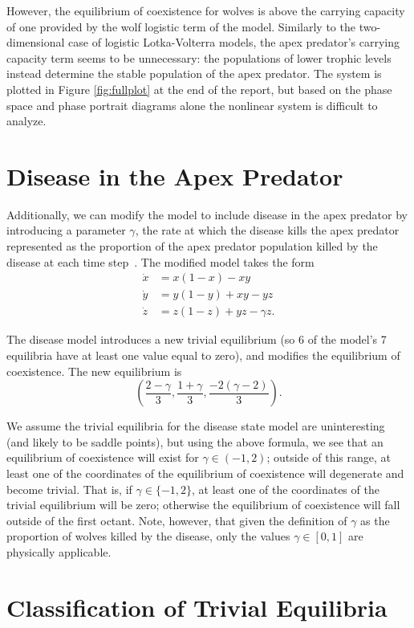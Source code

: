 \documentclass[10pt]{article}
\begin{document}
However, the equilibrium of coexistence for wolves is above the carrying capacity of one provided by the wolf logistic term of the model. Similarly to the two-dimensional case of logistic Lotka-Volterra models, the apex predator's carrying capacity term seems to be unnecessary: the populations of lower trophic levels instead determine the stable population of the apex predator. The system is plotted in Figure \ref{fig:fullplot} at the end of the report, but based on the phase space and phase portrait diagrams alone the nonlinear system is difficult to analyze.

\section{Disease in the Apex Predator}

Additionally, we can modify the model to include disease in the apex predator by introducing a parameter \(\gamma\), the rate at which the disease kills the apex predator represented as the proportion of the apex predator population killed by the disease at each time step~\cite{bdh}. The modified model takes the form
\begin{align*}
\dot{x} &= x(1-x)-xy \\
\dot{y} &= y(1-y)+xy-yz \\
\dot{z} &= z(1-z)+yz - \gamma z.
\end{align*}

The disease model introduces a new trivial equilibrium (so 6 of the model's 7 equilibria have at least one value equal to zero), and modifies the equilibrium of coexistence. The new equilibrium is
\[ \left(  \frac{2-\gamma}{3}, \frac{1+\gamma}{3}, \frac{-2(\gamma-2)}{3} \right). \]

We assume the trivial equilibria for the disease state model are uninteresting (and likely to be saddle points), but using the above formula, we see that an equilibrium of coexistence will exist for \( \gamma \in (-1,2) \); outside of this range, at least one of the coordinates of the equilibrium of coexistence will degenerate and become trivial. That is, if \(\gamma \in \{-1,2\} \), at least one of the coordinates of the trivial equilibrium will be zero; otherwise the equilibrium of coexistence will fall outside of the first octant. Note, however, that given the definition of \(\gamma\) as the proportion of wolves killed by the disease, only the values \(\gamma \in [0,1]\) are physically applicable. 


\section{Classification of Trivial Equilibria}
\end{document}
